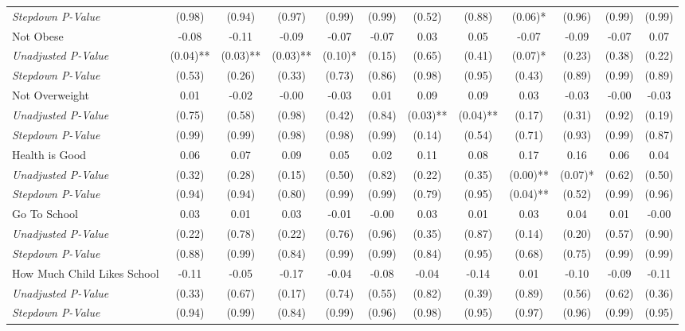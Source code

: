\begin{tabular}{l c c c c c c c c c c c}
\quad \textit{Stepdown P-Value} & (0.98) & (0.94) & (0.97) & (0.99) & (0.99) & (0.52) & (0.88) & (0.06)* & (0.96) & (0.99) & (0.99) \\
Not Obese & -0.08 & -0.11 & -0.09 & -0.07 & -0.07 & 0.03 & 0.05 & -0.07 & -0.09 & -0.07 & 0.07 \\
\quad \textit{Unadjusted P-Value} & (0.04)** & (0.03)** & (0.03)** & (0.10)* & (0.15) & (0.65) & (0.41) & (0.07)* & (0.23) & (0.38) & (0.22) \\
\quad \textit{Stepdown P-Value} & (0.53) & (0.26) & (0.33) & (0.73) & (0.86) & (0.98) & (0.95) & (0.43) & (0.89) & (0.99) & (0.89) \\
Not Overweight & 0.01 & -0.02 & -0.00 & -0.03 & 0.01 & 0.09 & 0.09 & 0.03 & -0.03 & -0.00 & -0.03 \\
\quad \textit{Unadjusted P-Value} & (0.75) & (0.58) & (0.98) & (0.42) & (0.84) & (0.03)** & (0.04)** & (0.17) & (0.31) & (0.92) & (0.19) \\
\quad \textit{Stepdown P-Value} & (0.99) & (0.99) & (0.98) & (0.98) & (0.99) & (0.14) & (0.54) & (0.71) & (0.93) & (0.99) & (0.87) \\
Health is Good & 0.06 & 0.07 & 0.09 & 0.05 & 0.02 & 0.11 & 0.08 & 0.17 & 0.16 & 0.06 & 0.04 \\
\quad \textit{Unadjusted P-Value} & (0.32) & (0.28) & (0.15) & (0.50) & (0.82) & (0.22) & (0.35) & (0.00)** & (0.07)* & (0.62) & (0.50) \\
\quad \textit{Stepdown P-Value} & (0.94) & (0.94) & (0.80) & (0.99) & (0.99) & (0.79) & (0.95) & (0.04)** & (0.52) & (0.99) & (0.96) \\
Go To School & 0.03 & 0.01 & 0.03 & -0.01 & -0.00 & 0.03 & 0.01 & 0.03 & 0.04 & 0.01 & -0.00 \\
\quad \textit{Unadjusted P-Value} & (0.22) & (0.78) & (0.22) & (0.76) & (0.96) & (0.35) & (0.87) & (0.14) & (0.20) & (0.57) & (0.90) \\
\quad \textit{Stepdown P-Value} & (0.88) & (0.99) & (0.84) & (0.99) & (0.99) & (0.84) & (0.95) & (0.68) & (0.75) & (0.99) & (0.99) \\
How Much Child Likes School & -0.11 & -0.05 & -0.17 & -0.04 & -0.08 & -0.04 & -0.14 & 0.01 & -0.10 & -0.09 & -0.11 \\
\quad \textit{Unadjusted P-Value} & (0.33) & (0.67) & (0.17) & (0.74) & (0.55) & (0.82) & (0.39) & (0.89) & (0.56) & (0.62) & (0.36) \\
\quad \textit{Stepdown P-Value} & (0.94) & (0.99) & (0.84) & (0.99) & (0.96) & (0.98) & (0.95) & (0.97) & (0.96) & (0.99) & (0.95) \\

\end{tabular}
